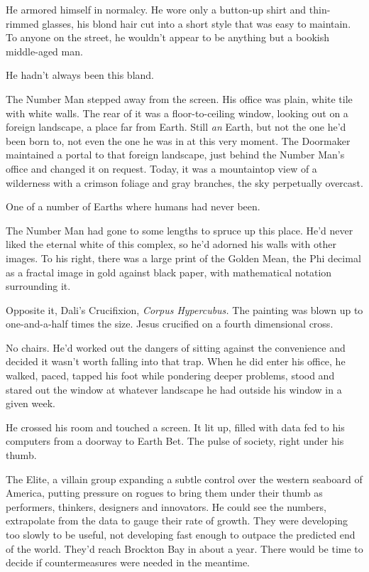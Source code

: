 He armored himself in normalcy.  He wore only a button-up shirt and thin-rimmed glasses, his blond hair cut into a short style that was easy to maintain.  To anyone on the street, he wouldn't appear to be anything but a bookish middle-aged man.



He hadn't always been this bland.



The Number Man stepped away from the screen.  His office was plain, white tile with white walls. The rear of it was a floor-to-ceiling window, looking out on a foreign landscape, a place far from Earth.  Still \emph{an} Earth, but not the one he'd been born to, not even the one he was in at this very moment.  The Doormaker maintained a portal to that foreign landscape, just behind the Number Man's office and changed it on request.  Today, it was a mountaintop view of a wilderness with a crimson foliage and gray branches, the sky perpetually overcast.



One of a number of Earths where humans had never been.



The Number Man had gone to some lengths to spruce up this place.  He'd never liked the eternal white of this complex, so he'd adorned his walls with other images.  To his right, there was a large print of the Golden Mean, the Phi decimal as a fractal image in gold against black paper, with mathematical notation surrounding it.



Opposite it, Dali's Crucifixion, \emph{Corpus Hypercubus.  }The painting was blown up to one-and-a-half times the size.  Jesus crucified on a fourth dimensional cross.



No chairs.  He'd worked out the dangers of sitting against the convenience and decided it wasn't worth falling into that trap.  When he did enter his office, he walked, paced, tapped his foot while pondering deeper problems, stood and stared out the window at whatever landscape he had outside his window in a given week.



He crossed his room and touched a screen.  It lit up, filled with data fed to his computers from a doorway to Earth Bet.  The pulse of society, right under his thumb.



The Elite, a villain group expanding a subtle control over the western seaboard of America, putting pressure on rogues to bring them under their thumb as performers, thinkers, designers and innovators.  He could see the numbers, extrapolate from the data to gauge their rate of growth.  They were developing too slowly to be useful, not developing fast enough to outpace the predicted end of the world.  They'd reach Brockton Bay in about a year.  There would be time to decide if countermeasures were needed in the meantime.



